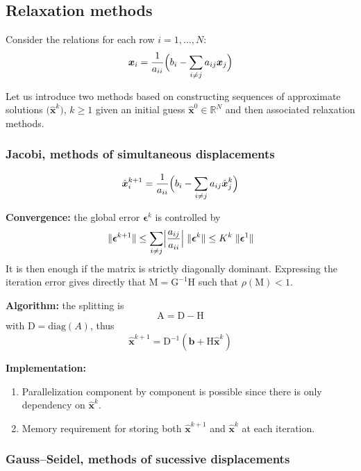 \documentclass{article}
\newcommand{\xR}{\mathbb{R}}
\newcommand{\xRN}{{\xR^N}}
\newcommand{\bb}{{\boldsymbol b}}
\newcommand{\ev}{{\boldsymbol \epsilon}}
\newcommand{\xx}{{\boldsymbol x}}
\newcommand{\hx}{\hat{\boldsymbol x}}
\newcommand{\mA}{{\mathrm A}}
\newcommand{\mD}{{\mathrm D}}
\newcommand{\mG}{{\mathrm G}}
\newcommand{\mH}{{\mathrm H}}
\newcommand{\mM}{{\mathrm M}}
\newcommand{\Seq}[1]{\bigl(#1\bigr)}
\newcommand{\norm}[1]{{\lVert #1 \rVert}}
\begin{document}
\subsection{Relaxation methods}

Consider the relations for each row $i=1,\dots,N$:
\begin{equation}
\xx_i = \frac{1}{a_{ii}}\Bigl( b_i - \sum_{i\neq j} a_{ij} \xx_j \Bigr)
\end{equation}

Let us introduce two methods based on constructing sequences of approximate solutions $\Seq{\hx^k}$, $k\geq1$ given an initial guess $\hx^0 \in \xRN$ and then associated relaxation methods.

\subsubsection{Jacobi, methods of simultaneous displacements}

\begin{equation}
\hx^{k+1}_i = \frac{1}{a_{ii}}\Bigl( b_i - \sum_{i\neq j} a_{ij} \hx^{k}_j \Bigr)
\end{equation}

\medskip
\textbf{Convergence:} the global error $\ev^k$ is controlled by
\begin{equation*}
\norm{\ev^{k+1}} \leq \sum_{i\neq j} \Bigl\lvert\frac{a_{ij}}{a_{ii}}\Bigr\rvert\;\norm{\ev^{k}} \leq K^k \; \norm{\ev^{1}}
\end{equation*}
It is then enough if the matrix is strictly diagonally dominant.
Expressing the iteration error gives directly that $\mM = \mG^{-1}\mH$ such that $\rho(\mM)< 1$.

\medskip
\textbf{Algorithm:} the splitting is
\[
\mA = \mD - \mH
\]
with $\mD = \mathrm{diag}(A)$, thus
\[
\hx^{k+1} = \mD^{-1}(\bb + \mH \hx^{k})
\]

\medskip
\textbf{Implementation:}
\begin{enumerate}
\item Parallelization component by component is possible since there is only dependency on $\hx^{k}$.
\item Memory requirement for storing both $\hx^{k+1}$ and $\hx^{k}$ at each iteration.
\end{enumerate}

\subsubsection{Gauss--Seidel, methods of sucessive displacements}
\end{document}

